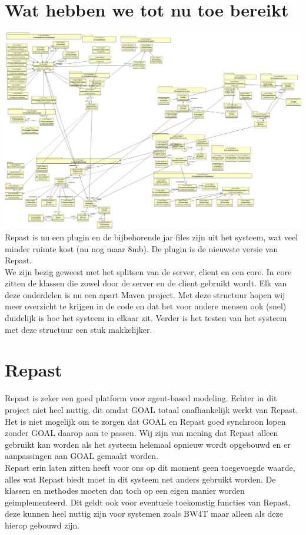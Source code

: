 \documentclass[11pt,a4paper]{article}
\begin{document}
\section{Wat hebben we tot nu toe bereikt}
\includegraphics[width=\linewidth]{UMLv2.png}
Repast is nu een plugin en de bijbehorende jar files zijn uit het systeem, wat veel minder ruimte kost (nu nog maar 8mb). De plugin is de nieuwste versie van Repast. \\
We zijn bezig geweest met het splitsen van de server, client en een core. In core zitten de klassen die zowel door de server en de client gebruikt wordt. Elk van deze onderdelen is nu een apart Maven project. Met deze structuur hopen wij meer overzicht te krijgen in de code en dat het voor andere mensen ook (snel) duidelijk is hoe het systeem in elkaar zit. Verder is het testen van het systeem met deze structuur een stuk makkelijker. 

\section{Repast}
Repast is zeker een goed platform voor agent-based modeling. Echter in dit project niet heel nuttig, dit omdat GOAL totaal onafhankelijk werkt van Repast. Het is niet mogelijk om te zorgen dat GOAL en Repast goed synchroon lopen zonder GOAL daarop aan te passen. Wij zijn van mening dat Repast alleen gebruikt kan worden als het systeem helemaal opnieuw wordt opgebouwd en er aanpassingen aan GOAL gemaakt worden. \\
Repast erin laten zitten heeft voor ons op dit moment geen toegevoegde waarde, alles wat Repast biedt moet in dit systeem net anders gebruikt worden. De klassen en methodes moeten dan toch op een eigen manier worden geimplementeerd. Dit geldt ook voor eventuele toekomstig functies van Repast, deze kunnen heel nuttig zijn voor systemen zoals BW4T maar alleen als deze hierop gebouwd zijn.
\end{document}
